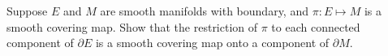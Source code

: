 Suppose $E$ and $M$ are smooth manifolds with boundary, and $\pi:E\mapsto M$ is a smooth covering map.  Show that the restriction of $\pi$ to each connected component of $\partial E$ is a smooth covering map onto a component of $\partial M$.